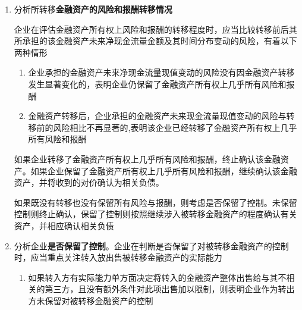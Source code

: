 \documentclass[UTF8,12pt]{ctexart}
\numberwithin{equation}{section} %
\numberwithin{figure}{section}
\numberwithin{table}{section}
\begin{document}
\begin{enumerate}
\begin{enumerate}
			\item 企业保留了收取金融资产现金流量的合同权利，但承担了将收取的该现金流量支付给一个或多个最终收款方的合同义务
		\end{enumerate}
		
		其中第二种情况实际上是一个过手安排，只有同时满足以下三种情况才继续分析，否则继续确认金融资产。
		\begin{enumerate}
			\item 不垫付。企业（转出方）只有从该金融资产收到对等的现金流量时，才有义务将其支付给最终收款方。
			
			\item 不挪用。转让合同规定禁止企业（转出方）出售或抵押该金融资产，但企业可以将其作为向最终收款方支付现金流量义务的保证。
			
			\item 不延误。企业（转出方）有义务将代表最终收款方收取的所有现金流量及时划转给最终收款方，且无重大延误。企业无权将该现金流量进行再投资。
		\end{enumerate}
		
		\item 分析所转移\textbf{金融资产的风险和报酬转移情况}
		
		企业在评估金融资产所有权上风险和报酬的转移程度时，应当比较转移前后其所承担的该金融资产未来净现金流量金额及其时间分布变动的风险，有着以下两种情形
		\begin{enumerate}
			\item 企业承担的金融资产未来净现金流量现值变动的风险没有因金融资产转移发生显著变化的，表明企业仍保留了金融资产所有权上几乎所有风险和报酬
			
			\item 金融资产转移后，企业承担的金融资产未来现金流量现值变动的风险与转移前的风险相比不再显著的,表明该企业已经转移了金融资产所有权上几乎所有风险和报酬
		\end{enumerate}
	
		如果企业转移了金融资产所有权上几乎所有风险和报酬，终止确认该金融资产。如果企业保留了金融资产所有权上几乎所有风险和报酬，继续确认该金融资产，并将收到的对价确认为相关负债。
		
		如果既没有转移也没有保留所有风险与报酬，则考虑是否保留了控制。未保留控制则终止确认，保留了控制则按照继续涉入被转移金融资产的程度确认有关资产，并相应确认相关负债
		
		\item 分析企业\textbf{是否保留了控制}。企业在判断是否保留了对被转移金融资产的控制时，应当重点关注转入放出售被转移金融资产的实际能力
		\begin{enumerate}
			\item 如果转入方有实际能力单方面决定将转入的金融资产整体出售给与其不相关的第三方，且没有额外条件对此项出售加以限制，则表明企业作为转出方未保留对被转移金融资产的控制
			

\end{enumerate}
\end{enumerate}
\end{document}
